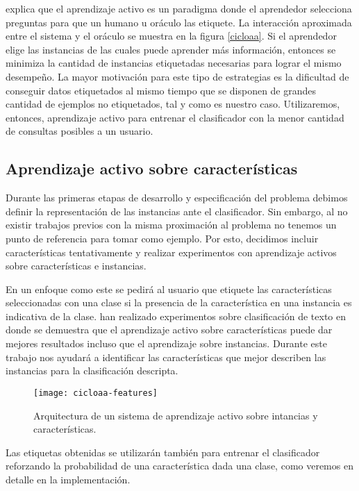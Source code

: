 \citet{settles_active_learning_survey} explica que el aprendizaje activo es un paradigma donde el aprendedor selecciona preguntas para que un humano u oráculo las etiquete. La interacción aproximada entre el sistema y el oráculo se muestra en la figura \ref{cicloaa}. Si el aprendedor elige las instancias de las cuales puede aprender más información, entonces se minimiza la cantidad de instancias etiquetadas necesarias para lograr el mismo desempeño. La mayor motivación para este tipo de estrategias es la dificultad de conseguir datos etiquetados al mismo tiempo que se disponen de grandes cantidad de ejemplos no etiquetados, tal y como es nuestro caso. Utilizaremos, entonces, aprendizaje activo para entrenar el clasificador con la menor cantidad de consultas posibles a un usuario.

\subsection{Aprendizaje activo sobre características}

Durante las primeras etapas de desarrollo y especificación del problema debimos definir la representación de las instancias ante el clasificador. Sin embargo, al no existir trabajos previos con la misma proximación al problema no tenemos un punto de referencia para tomar como ejemplo. Por esto, decidimos incluir características tentativamente y realizar experimentos con aprendizaje activos sobre características e instancias.


En un enfoque como este se pedirá al usuario que etiquete las características seleccionadas con una clase si la presencia de la característica en una instancia es indicativa de la clase. \citet{settles-al-features} han realizado experimentos sobre clasificación de texto en donde se demuestra que el aprendizaje activo sobre características puede dar mejores resultados incluso que el aprendizaje sobre instancias. Durante este trabajo nos ayudará a identificar las características que mejor describen las instancias para la clasificación descripta.

\begin{figure}[h!]\label{aa-features}
\caption{Arquitectura de un sistema de aprendizaje activo sobre intancias y características.}
\texttt{[image: cicloaa-features]}
\centering
\end{figure}

Las etiquetas obtenidas se utilizarán también para entrenar el clasificador reforzando la probabilidad de una característica dada una clase, como veremos en detalle en la implementación.

